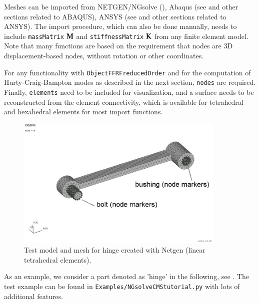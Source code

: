 Meshes can be imported from NETGEN/NGsolve (), Abaqus (see  and other sections related to ABAQUS), ANSYS (see  and other sections related to ANSYS).
The import procedure, which can also be done manually, needs to include \texttt{massMatrix} $\mathbf{M}$ and \texttt{stiffnessMatrix} $\mathbf{K}$ from any finite element model.
Note that many functions are based on the requirement that nodes are 3D displacement-based nodes, without rotation or other coordinates.

For any functionality with \texttt{ObjectFFRFreducedOrder} and for the computation of Hurty-Craig-Bampton modes as described in the next section, \texttt{nodes}
are required.
Finally, \texttt{elements} need to be included for visualization, and a surface needs to be reconstructed from the element connectivity, which is available for tetrahedral and hexahedral elements for most import functions.

\begin{figure}[tbph]
  \begin{center}
  \includegraphics[width=10cm]{figures/modesHinge/HCBhingeMesh.jpg}
  \end{center}
  \caption{Test model and mesh for hinge created with Netgen (linear tetrahedral elements).}
	\label{fig_hingePartMesh}
\end{figure}
As an example, we consider a part denoted as 'hinge' in the following, see . The test example can be found in \texttt{Examples/NGsolveCMStutorial.py} with lots of additional features.


